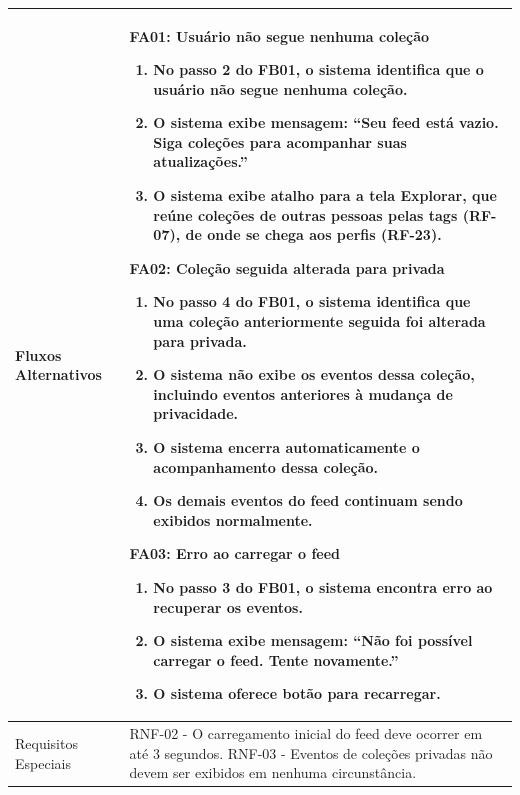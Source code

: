\begin{longtable}{ >{\raggedright}p{2.8cm} | >{\raggedright\arraybackslash}p{10.7cm} }
Fluxos Alternativos & \mbox{}
\textbf{FA01:} Usuário não segue nenhuma coleção
\vspace{2pt}
\begin{enumerate}[nosep,leftmargin=1.2em,topsep=0pt,partopsep=0pt,parsep=0pt,itemsep=0pt,after=\vspace{2pt}]
    \item No passo 2 do FB01, o sistema identifica que o usuário não segue nenhuma coleção.
    \item O sistema exibe mensagem: ``Seu feed está vazio. Siga coleções para acompanhar suas atualizações.''
    \item O sistema exibe atalho para a tela Explorar, que reúne coleções de outras pessoas pelas tags (RF-07), de onde se chega aos perfis (RF-23).
\end{enumerate}

\textbf{FA02:} Coleção seguida alterada para privada
\vspace{2pt}
\begin{enumerate}[nosep,leftmargin=1.2em,topsep=0pt,partopsep=0pt,parsep=0pt,itemsep=0pt,after=\vspace{2pt}]
    \item No passo 4 do FB01, o sistema identifica que uma coleção anteriormente seguida foi alterada para privada.
    \item O sistema não exibe os eventos dessa coleção, incluindo eventos anteriores à mudança de privacidade.
    \item O sistema encerra automaticamente o acompanhamento dessa coleção.
    \item Os demais eventos do feed continuam sendo exibidos normalmente.
\end{enumerate}

\textbf{FA03:} Erro ao carregar o feed
\vspace{2pt}
\begin{enumerate}[nosep,leftmargin=1.2em,topsep=0pt,partopsep=0pt,parsep=0pt,itemsep=0pt,after=\vspace{2pt}]
    \item No passo 3 do FB01, o sistema encontra erro ao recuperar os eventos.
    \item O sistema exibe mensagem: ``Não foi possível carregar o feed. Tente novamente.''
    \item O sistema oferece botão para recarregar.
\end{enumerate}
\mbox{} \\ \hline

Requisitos Especiais & RNF-02 - O carregamento inicial do feed deve ocorrer em até 3 segundos. RNF-03 - Eventos de coleções privadas não devem ser exibidos em nenhuma circunstância. \\ \hline


\end{longtable}
